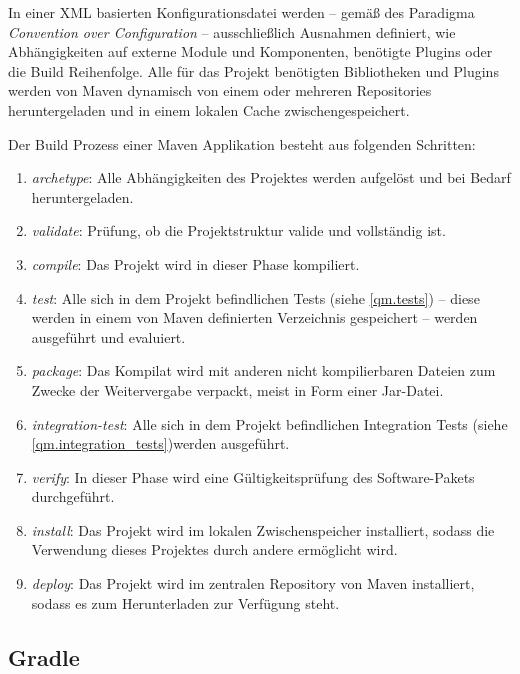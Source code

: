 			 In einer XML basierten Konfigurationsdatei werden -- gemäß des Paradigma \textit{Convention over Configuration} -- ausschließlich Ausnahmen definiert, wie Abhängigkeiten auf externe Module und Komponenten, benötigte Plugins oder die Build Reihenfolge. Alle für das Projekt benötigten Bibliotheken und Plugins werden von Maven dynamisch von einem oder mehreren Repositories heruntergeladen und in einem lokalen Cache zwischengespeichert. \cite{Company.2009}
			 
			 Der Build Prozess einer Maven Applikation besteht aus folgenden Schritten:
			 
			 \begin{enumerate}
			 	\item \textit{archetype}: Alle Abhängigkeiten des Projektes werden aufgelöst und bei Bedarf heruntergeladen.
			 	\item \textit{validate}: Prüfung, ob die Projektstruktur valide und vollständig ist.
			 	\item \textit{compile}: Das Projekt wird in dieser Phase kompiliert. 
			 	\item \textit{test}: Alle sich in dem Projekt befindlichen Tests (siehe \autoref{qm.tests}) -- diese werden in einem von Maven definierten Verzeichnis gespeichert -- werden ausgeführt und evaluiert.
			 	\item \textit{package}: Das Kompilat wird mit anderen nicht kompilierbaren Dateien zum Zwecke der Weitervergabe verpackt, meist in Form einer Jar-Datei.
			 	\item \textit{integration-test}: Alle sich in dem Projekt befindlichen Integration Tests (siehe \autoref{qm.integration_tests})werden ausgeführt. 
			 	\item \textit{verify}: In dieser Phase wird eine Gültigkeitsprüfung des Software-Pakets durchgeführt.
			 	\item \textit{install}: Das Projekt wird im lokalen Zwischenspeicher installiert, sodass die Verwendung dieses Projektes durch andere ermöglicht wird. 
			 	\item \textit{deploy}: Das Projekt wird im zentralen Repository von Maven installiert, sodass es zum Herunterladen zur Verfügung steht. 
			 \end{enumerate}
			 
		\subsection{Gradle} \label{sec:gradle}
			
